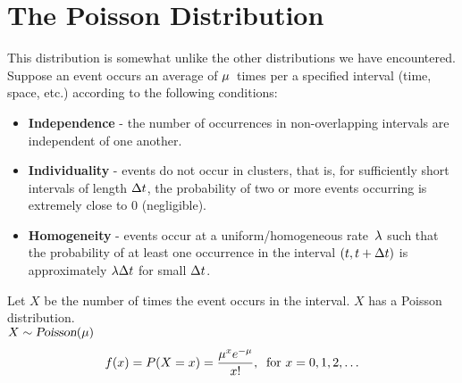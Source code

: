 \section{The Poisson Distribution}
This distribution is somewhat unlike the other distributions we have encountered. Suppose an event occurs an average of $\mu$~times per a specified interval (time, space, etc.) according to the following conditions:
\begin{itemize}
    \item \textbf{Independence} - the number of occurrences in non-overlapping intervals are independent of one another.
    \item \textbf{Individuality} - events do not occur in clusters, that is, for sufficiently short intervals of length $\Delta t$, the probability of two or more events occurring is extremely close to 0 (negligible).
    \item \textbf{Homogeneity} - events occur at a uniform/homogeneous rate~$\lambda$ such that the probability of at least one occurrence in the interval $(t, t+\Delta t)$ is approximately $\lambda \Delta t$ for small $\Delta t$.
\end{itemize}
Let $X$ be the number of times the event occurs in the interval. $X$ has a Poisson distribution. \\
$X \sim \operatorname{\textsl{Poisson}}(\mu)$
\[
    f(x) = P(X = x) = \frac{\mu^x e^{-\mu}}{x!},\:\text{ for } x = 0,1,2,\ldots
\]
